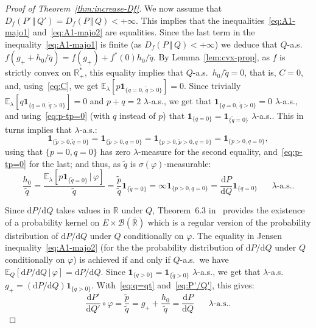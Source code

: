 \documentclass[12pt]{article}
\newcommand{\cb}{{\mathcal B}}
\newcommand{\E}{{\mathbb E}}
\newcommand{\R}{{\mathbb R}}
\newcommand{\ind}{\mathbf{1}}
\newcommand{\rd}{\mathrm{d}}
\theoremstyle{plain}
\theoremstyle{remark}
\begin{document}
\begin{proof}[Proof of Theorem~\ref{thm:increase-Df}]
 \medskip

 We                   now                  assume                   that
 $ D_f (P' \, \Vert\, Q')= D_f  (P \, \Vert\, Q)<+\infty $. This implies
 that  the inequalities~\eqref{eq:A1-majo1}  and~\eqref{eq:A1-majo2} are
 equalities.  Since the last  term in the inequality~\eqref{eq:A1-majo1}
 is finite (as $D_f (P \, \Vert\, Q)<+\infty $) we deduce that $Q$-a.s.\
 $f(g_+  +  h_0/\tilde  q)  =  f(g_+)  +  f^*(0)  h_0/  \tilde  q$.   By
 Lemma~\ref{lem:cvx-prop}, as  $f$ is strictly convex  on $\R_+^*$, this
 equality implies that $Q$-a.s.\ $h_0/\tilde  q=0$, that is, $C=0$, and,
 using~\eqref{eq:C},                        we                       get
 $\E_\lambda[p\ind_{\{q=0, \,  \tilde   q   >0\}}]=0$.   Since   trivially
 $\E_\lambda[q\ind_{\{q=0, \,    \tilde    q    >0\}}]=0$    and    $p+q=2$
 $\lambda$-a.s.,   we   get    that   $\ind_{\{q=0, \,   \tilde   q>0\}}=0$
 $\lambda$-a.s., and using~\eqref{eq:p-tp=0} (with $q$  instead of $p$) that
 $\ind_{\{q=0\}}= \ind_{\{\tilde q=0\}}$ $\lambda$-a.s..
 This in turns implies that $\lambda$-a.s.:
 \[
   \ind_{\{\tilde p>0, \tilde q=0\}}
   =  \ind_{\{\tilde p>0,  q=0\}}
   =  \ind_{\{p>0, \tilde p>0,  q=0\}}
   =  \ind_{\{p>0,   q=0\}},
 \]
 using   that $\{p=0, q=0\}$ has zero
 $\lambda$-measure for the second equality, and~\eqref{eq:p-tp=0} for the last; and thus,
as $\tilde q$ is $\sigma(\varphi)$-measurable:
 \begin{equation}
   \label{eq:q=qt}
   \frac{h_0}{\tilde q}
   = \frac{\E_\lambda[p \ind_{\{\tilde q =0\}} \, |\, \varphi]}{\tilde q}
   =\frac{\tilde p}{\tilde q} \ind_{\{\tilde  q=0\}}=\infty  \ind_{\{p>0,   q=0\}}
   =\frac{\rd P}{\rd Q}  \ind_{\{ q=0\}}
   \quad\text{ $\lambda$-a.s..}
 \end{equation}

 Since  $\rd P/\rd  Q$  takes values  in $  \R$  under $Q$,  Theorem~6.3
 in~\cite{k:foundations} provides the existence  of a probability kernel
 on $E\times \cb(\bar \R)$ which is a regular version of the probability
 distribution of  $\rd P/\rd  Q$ under  $Q$ conditionally  on $\varphi$.
 The  equality in  Jensen  inequality~\eqref{eq:A1-majo2}  (for the  the
 probability distribution  of $\rd P/\rd  Q$ under $Q$  conditionally on
 $\varphi$)   is   achieved  if   and   only   if  $Q$-a.s.\   we   have
 $\E_Q[\rd P/\rd Q\, |\, \varphi]=\rd P/\rd Q$.
Since  $\ind_{\{q>0\}}= \ind_{\{\tilde q>0\}}$ $\lambda$-a.s., we get
that   $\lambda$-a.s. $g_+=(\rd P/\rd Q)\ind_{\{q>0\}}$.
With~\eqref{eq:q=qt} and~\eqref{eq:P'/Q'}, this gives:
\[
     \frac{\rd P'}{\rd Q'}\circ \varphi
   = \frac{\tilde p}{\tilde q}
   = g_+  + \frac{h_0 }{\tilde q}
   = \frac{\rd P}{\rd Q}   \quad\text{ $\lambda$-a.s..}
 \] %
\end{proof}
\end{document}
